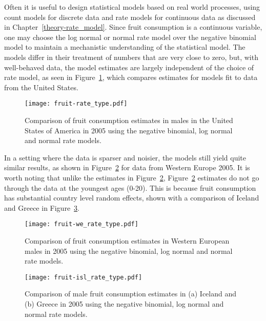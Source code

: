 Often it is useful to design statistical models based on real world
processes, using count models for discrete data and rate models for
continuous data as discussed in Chapter~\ref{theory-rate_model}.
Since fruit consumption is a continuous variable, one may choose the
log normal or normal rate model over the negative binomial model to
maintain a mechanistic understanding of the statistical model.  The
models differ in their treatment of numbers that are very close to
zero, but, with well-behaved data, the model estimates are largely
independent of the choice of rate model, as seen in
Figure~\ref{fig:app-fruit rate type}, which compares estimates for
models fit to data from the United States.

    \begin{figure}[h]
        \begin{center}
            \texttt{[image: fruit-rate\_type.pdf]}
            \caption{Comparison of fruit consumption estimates in
              males in the United States of America in 2005 using the
              negative binomial, log normal and normal rate models.}
            \label{fig:app-fruit rate type}
        \end{center}
    \end{figure}

In a setting where the data is sparser and noisier, the
models still yield quite similar results, as shown in Figure~\ref{fig:app-fruit europe}
for data from Western Europe 2005.  It is worth noting that unlike
the estimates in Figure~\ref{fig:app-fruit europe},
Figure~\ref{fig:app-fruit europe} estimates do not go through the
data at the youngest ages (0-20).  This is because fruit consumption has
substantial country level random effects, shown with a comparison of
Iceland and Greece in Figure~\ref{fig:app-fruit countries}.

    \begin{figure}[h]
        \begin{center}
            \texttt{[image: fruit-we\_rate\_type.pdf]}
            \caption{Comparison of fruit consumption estimates in
              Western European males in 2005 using the
              negative binomial, log normal and normal rate models.}
            \label{fig:app-fruit europe}
        \end{center}
    \end{figure}

    \begin{figure}[h]
        \begin{center}
            \texttt{[image: fruit-isl\_rate\_type.pdf]}
            \caption{Comparison of male fruit consumption estimates in
              (a) Iceland and (b) Greece in 2005 using the
              negative binomial, log normal and normal rate models.}
            \label{fig:app-fruit countries}
        \end{center}
    \end{figure}

